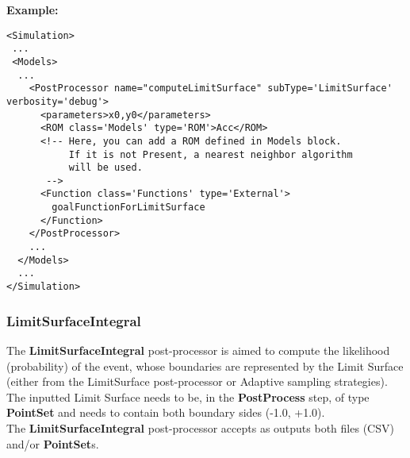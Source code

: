 \textbf{Example:}
\begin{lstlisting}[style=XML,morekeywords={name,subType,debug,class,type}]
<Simulation>
 ...
 <Models>
  ...
    <PostProcessor name="computeLimitSurface" subType='LimitSurface' verbosity='debug'>
      <parameters>x0,y0</parameters>
      <ROM class='Models' type='ROM'>Acc</ROM>
      <!-- Here, you can add a ROM defined in Models block.
           If it is not Present, a nearest neighbor algorithm
           will be used.
       -->
      <Function class='Functions' type='External'>
        goalFunctionForLimitSurface
      </Function>
    </PostProcessor>
    ...
  </Models>
  ...
</Simulation>
\end{lstlisting}


\subsubsection{LimitSurfaceIntegral}
\label{LimitSurfaceIntegral}
The \textbf{LimitSurfaceIntegral} post-processor is aimed to compute the likelihood (probability) of the event, whose boundaries are
represented by the Limit Surface (either from the LimitSurface post-processor or Adaptive sampling strategies).
The inputted Limit Surface needs to be, in the  \textbf{PostProcess} step, of type  \textbf{PointSet} and needs to contain
both boundary sides (-1.0, +1.0).
\\ The \textbf{LimitSurfaceIntegral} post-processor accepts as outputs both files (CSV) and/or  \textbf{PointSet}s.

